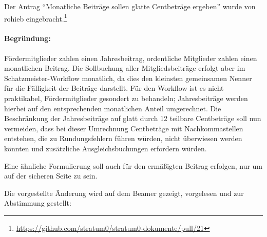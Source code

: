 \documentclass{s0minutes}
\begin{document}
Der Antrag "`Monatliche Beiträge sollen glatte Centbeträge ergeben"' wurde von
rohieb
eingebracht.\footnote{\url{https://github.com/stratum0/stratum0-dokumente/pull/21}}

\paragraph{Begründung:} Fördermitglieder zahlen einen Jahresbeitrag, ordentliche
Mitglieder zahlen einen monatlichen Beitrag. Die Sollbuchung aller
Mitgliedsbeiträge erfolgt aber im Schatz\-meister-Workflow monatlich, da dies den
kleinsten gemeinsamen Nenner für die Fälligkeit der Beiträge darstellt. Für den
Workflow ist es nicht praktikabel, Fördermitglieder gesondert zu behandeln;
Jahresbeiträge werden hierbei auf den entsprechenden monatlichen Anteil
umgerechnet. Die Beschränkung der Jahresbeiträge auf glatt durch 12 teilbare
Centbeträge soll nun vermeiden, dass bei dieser Umrechnung Centbeträge mit
Nachkommastellen entstehen, die zu Rundungsfehlern führen würden, nicht
überwiesen werden könnten und zusätzliche Ausgleichsbuchungen erfordern würden.

Eine ähnliche Formulierung soll auch für den ermäßigten Beitrag erfolgen, nur um
auf der sicheren Seite zu sein.



Die vorgestellte Änderung wird auf dem Beamer gezeigt, vorgelesen und zur
Abstimmung gestellt:
\end{document}

